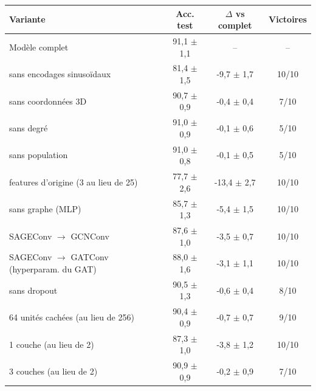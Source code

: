 \begin{tabular}{l c c c}
\hline
Variante & Acc. test & $\Delta$ vs complet & Victoires \\
\hline
Modèle complet & 91,1 $\pm$ 1,1 & -- & -- \\
\hline
sans encodages sinusoïdaux & 81,4 $\pm$ 1,5 & -9,7 $\pm$ 1,7 & 10/10 \\
sans coordonnées 3D & 90,7 $\pm$ 0,9 & -0,4 $\pm$ 0,4 & 7/10 \\
sans degré & 91,0 $\pm$ 0,9 & -0,1 $\pm$ 0,6 & 5/10 \\
sans population & 91,0 $\pm$ 0,8 & -0,1 $\pm$ 0,5 & 5/10 \\
features d'origine (3 au lieu de 25) & 77,7 $\pm$ 2,6 & -13,4 $\pm$ 2,7 & 10/10 \\
sans graphe (MLP) & 85,7 $\pm$ 1,3 & -5,4 $\pm$ 1,5 & 10/10 \\
SAGEConv $\rightarrow$ GCNConv & 87,6 $\pm$ 1,0 & -3,5 $\pm$ 0,7 & 10/10 \\
SAGEConv $\rightarrow$ GATConv (hyperparam. du GAT) & 88,0 $\pm$ 1,6 & -3,1 $\pm$ 1,1 & 10/10 \\
sans dropout & 90,5 $\pm$ 1,3 & -0,6 $\pm$ 0,4 & 8/10 \\
64 unités cachées (au lieu de 256) & 90,4 $\pm$ 0,9 & -0,7 $\pm$ 0,7 & 9/10 \\
1 couche (au lieu de 2) & 87,3 $\pm$ 1,0 & -3,8 $\pm$ 1,2 & 10/10 \\
3 couches (au lieu de 2) & 90,9 $\pm$ 0,9 & -0,2 $\pm$ 0,9 & 7/10 \\
\hline
\end{tabular}
